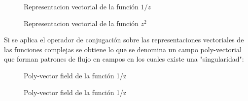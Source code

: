 \begin{figure}[H]
    \centering
    \begin{minipage}{0.49\textwidth}
        \centering
    \end{minipage}
    \begin{minipage}{0.49\textwidth}
        \centering
    \end{minipage}
    \caption{Representacion vectorial de la función $1/z$}
    \label{fig:VectFInvz}
\end{figure}
\begin{figure}[H]
    \centering
    \begin{minipage}{0.49\textwidth}
        \centering
    \end{minipage}
    \begin{minipage}{0.49\textwidth}
        \centering
    \end{minipage}
    \caption{Representacion vectorial de la función $z^2$}
    \label{fig:VectFZ^2}
\end{figure}
Si se aplica el operador de conjugación sobre las representaciones vectoriales de las funciones complejas se obtiene lo que se denomina un campo poly-vectorial que forman patrones de flujo en campos en los cuales existe una "singularidad":
\begin{figure}[H]
    \centering
    \caption{Poly-vector field de la función 1/z}
    \label{inv-Poly-vector}
\end{figure}
\begin{figure}[H]
    \centering
    
    \caption{Poly-vector field de la función 1/z}
    \label{z^2-Poly-vector}
\end{figure}